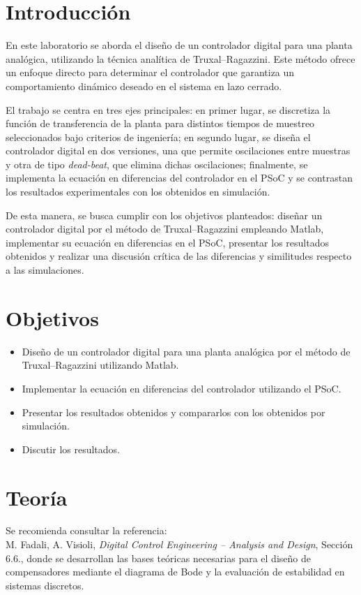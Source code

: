 \section{Introducción}

 En este laboratorio se aborda el diseño de un controlador digital para una planta analógica, utilizando la técnica analítica de Truxal--Ragazzini. Este método ofrece un enfoque directo para determinar el controlador que garantiza un comportamiento dinámico deseado en el sistema en lazo cerrado.

El trabajo se centra en tres ejes principales: en primer lugar, se discretiza la función de transferencia de la planta para distintos tiempos de muestreo seleccionados bajo criterios de ingeniería; en segundo lugar, se diseña el controlador digital en dos versiones, una que permite oscilaciones entre muestras y otra de tipo \emph{dead-beat}, que elimina dichas oscilaciones; finalmente, se implementa la ecuación en diferencias del controlador en el PSoC y se contrastan los resultados experimentales con los obtenidos en simulación.

De esta manera, se busca cumplir con los objetivos planteados: diseñar un controlador digital por el método de Truxal--Ragazzini empleando Matlab, implementar su ecuación en diferencias en el PSoC, presentar los resultados obtenidos y realizar una discusión crítica de las diferencias y similitudes respecto a las simulaciones.



\section{Objetivos}
\begin{itemize}
	\item Diseño de un controlador digital para una planta analógica por el método de Truxal--Ragazzini utilizando Matlab.
	\item Implementar la ecuación en diferencias del controlador utilizando el PSoC.
	\item Presentar los resultados obtenidos y compararlos con los obtenidos por simulación.
	\item Discutir los resultados. 
\end{itemize}

\section{Teoría}
Se recomienda consultar la referencia: \\
M. Fadali, A. Visioli, \textit{Digital Control Engineering – Analysis and Design}, Sección 6.6., donde se desarrollan las bases teóricas necesarias para el diseño de compensadores mediante el diagrama de Bode y la evaluación de estabilidad en sistemas discretos.

